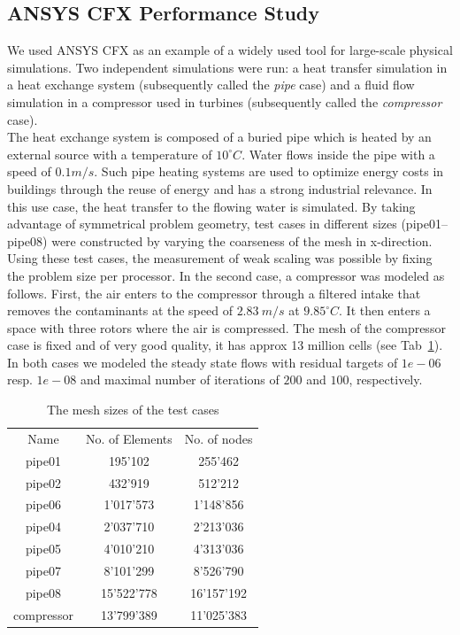 \documentclass[3p,times]{elsarticle}
\begin{document}
\subsection{ANSYS CFX Performance Study}
We used ANSYS CFX as an example of a widely used tool for large-scale physical simulations. Two independent simulations were run: a heat transfer simulation in a heat exchange system (subsequently called the \textit{pipe} case) and a fluid flow simulation in a compressor used in turbines (subsequently called the \textit{compressor} case).\\
The heat exchange system is composed of a buried pipe which is heated by an external source with a temperature of  $10 ^\circ C$. Water flows inside the pipe with a speed of $0.1m/s$. Such pipe heating systems are used to optimize energy costs in buildings through the reuse of energy and has a strong industrial relevance. In this use case, the heat transfer to the flowing water is simulated. By taking advantage of symmetrical problem geometry, test cases in different sizes (pipe01--pipe08) were constructed by varying the coarseness of the mesh in x-direction. Using these test cases, the measurement of weak scaling was possible by fixing the problem size per processor.
In the second case, a compressor was modeled as follows. First, the air enters to the compressor through a filtered intake that removes the contaminants at the speed of $2.83\ m/s$ at $9.85 ^\circ C$. It then enters a space with three rotors where the air is compressed. The mesh of the compressor case is fixed and of very good quality, it has approx 13 million cells (see Tab~\ref{tab:MeshSize}). In both cases we modeled the steady state flows with residual targets of $1e-06$ resp. $1e-08$ and maximal number of iterations of $200$ and $100$, respectively. 

\begin{table}
	\centering
		\begin{tabular} {|c|c|c|}
			\hline
			Name & No. of Elements & No. of nodes \\			
			pipe01 & 195'102 & 255'462 \\ \hline
			pipe02 & 432'919 & 512'212 \\ \hline
			pipe06 & 1'017'573 & 1'148'856 \\ \hline
			pipe04 & 2'037'710 & 2'213'036 \\ \hline
			pipe05 & 4'010'210 & 4'313'036 \\ \hline			
			pipe07 & 8'101'299 & 8'526'790 \\ \hline
			pipe08 & 15'522'778 & 16'157'192 \\ \hline
			compressor & 13'799'389  & 11'025'383 \\ \hline
		\end{tabular}
	\caption{The mesh sizes of the test cases}
	\label{tab:MeshSize}
\end{table}
\end{document}
